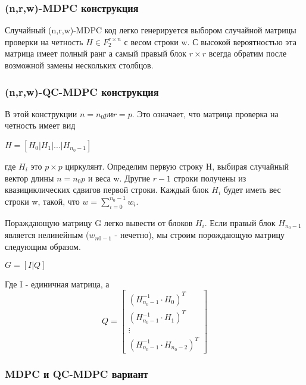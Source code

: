 \documentclass[12pt]{article}
\begin{document}
\subsubsection{(n,r,w)-MDPC конструкция}

Случайный (n,r,w)-MDPC код легко генерируется выбором случайной матрицы проверки на четность $H \in F^{r \times n}_{2}$ с весом строки w. С высокой вероятностью эта матрица имеет полный ранг а самый правый блок $r \times r$ всегда обратим после возможной замены нескольких столбцов.

\newpage

\subsubsection{(n,r,w)-QC-MDPC конструкция}

В этой конструкции $n = n_{0}p и r = p$. Это означает, что матрица проверка на четность имеет вид\\
\begin{center}
$H = [H_{0}|H_{1}| . . . |H_{n_{0}-1}]$
\end{center}
где $H_{i}$ это $p \times p$  циркулянт.
Определим первую строку H, выбирая случайный вектор длины $n = n_{0}p$ и веса w. Другие $r - 1$ строки получены из квазициклических сдвигов первой строки. Каждый блок $H_{i}$ будет иметь вес строки w, такой, что  $ w = \sum\nolimits_{i=0}^{n_{0}-1} w_{i}$. 

Пораждающую матрицу G легко вывести от блоков $H_{i}$. Если правый блок $H_{n_{0} - 1}$ является нелинейным ($w_{n{0} - 1}$ - нечетно), мы строим порождающую матрицу следующим образом.

\begin{center}
\textbf{$ G = [I|Q] $} \\
\end{center}
Где I - единичная матрица, а \[ 
Q = \begin{bmatrix}  (H^{-1}_{n_{0}-1}\cdot H_{0})^{T}\\(H^{-1}_{n_{0}-1}\cdot H_{1})^{T}\\ \vdots \\ (H^{-1}_{n_{0}-1}\cdot H_{n_{0}-2})^{T} \end{bmatrix}
\]

\subsubsection{MDPC и QC-MDPC вариант}
\end{document}
